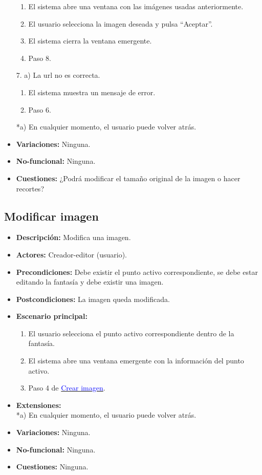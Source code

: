 \begin{itemize}
	\begin{enumerate}
		\item El sistema abre una ventana con las imágenes usadas anteriormente.
		\item El usuario selecciona la imagen deseada y pulsa ``Aceptar''.
		\item El sistema cierra la ventana emergente.
		\item Paso 8.
	\end{enumerate}
	7. a) La url no es correcta.
	\begin{enumerate}
		\item El sistema muestra un mensaje de error.
		\item Paso 6.
	\end{enumerate}
	*a) En cualquier momento, el usuario puede volver atrás.
	\item \textbf{Variaciones:} Ninguna.
	\item \textbf{No-funcional:} Ninguna.
	\item \textbf{Cuestiones:} ¿Podrá modificar el tamaño original de la imagen o hacer recortes?
\end{itemize}

\subsection{Modificar imagen}
\begin{itemize}
	\item \textbf{Descripción:} Modifica una imagen.
	\item \textbf{Actores:} Creador-editor (usuario).
	\item \textbf{Precondiciones:} Debe existir el punto activo correspondiente, se debe estar editando la fantasía y debe existir una imagen.
	\item \textbf{Postcondiciones:} La imagen queda modificada.
	\item \textbf{Escenario principal:}
	\begin{enumerate}
		\item El usuario selecciona el punto activo correspondiente dentro de la fantasía.
		\item El sistema abre una ventana emergente con la información del punto activo.
		\item Paso 4 de \hyperlink{crearimagen}{\textcolor{blue}{Crear imagen}}.
	\end{enumerate}
	\item \textbf{Extensiones:} \\ *a) En cualquier momento, el usuario puede volver atrás.
	\item \textbf{Variaciones:} Ninguna.
	\item \textbf{No-funcional:} Ninguna.
	\item \textbf{Cuestiones:} Ninguna.
\end{itemize}

